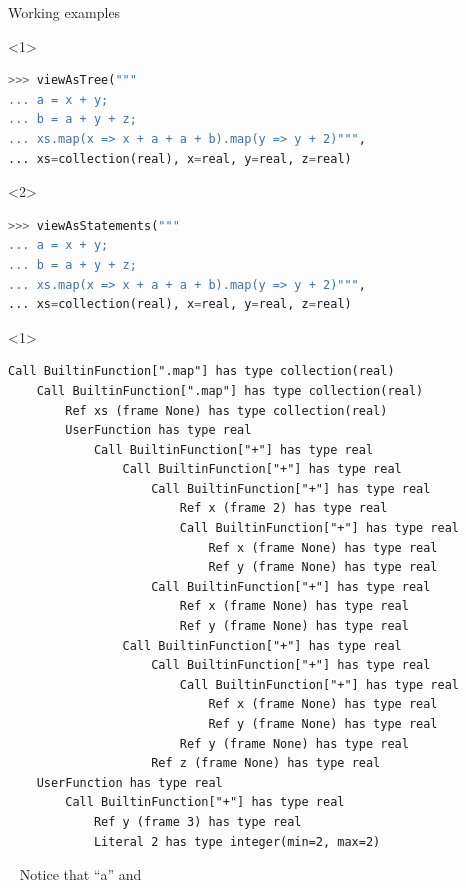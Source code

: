 \documentclass{beamer}
\begin{document}
\begin{frame}[fragile]{Working examples}
\begin{onlyenv}<1>
\begin{lstlisting}[language=python]
>>> viewAsTree("""
... a = x + y;
... b = a + y + z;
... xs.map(x => x + a + a + b).map(y => y + 2)""",
... xs=collection(real), x=real, y=real, z=real)
\end{lstlisting}
\end{onlyenv}
\begin{onlyenv}<2>
\begin{lstlisting}[language=python]
>>> viewAsStatements("""
... a = x + y;
... b = a + y + z;
... xs.map(x => x + a + a + b).map(y => y + 2)""",
... xs=collection(real), x=real, y=real, z=real)
\end{lstlisting}
\end{onlyenv}

\vspace{-0.5 cm}
\begin{minipage}[t][12cm][t]{\textwidth}
\begin{onlyenv}<1>
\begin{lstlisting}[basicstyle=\ttfamily\tiny]
Call BuiltinFunction[".map"] has type collection(real)
    Call BuiltinFunction[".map"] has type collection(real)
        Ref xs (frame None) has type collection(real)
        UserFunction has type real
            Call BuiltinFunction["+"] has type real
                Call BuiltinFunction["+"] has type real
                    Call BuiltinFunction["+"] has type real
                        Ref x (frame 2) has type real
                        Call BuiltinFunction["+"] has type real
                            Ref x (frame None) has type real
                            Ref y (frame None) has type real
                    Call BuiltinFunction["+"] has type real
                        Ref x (frame None) has type real
                        Ref y (frame None) has type real
                Call BuiltinFunction["+"] has type real
                    Call BuiltinFunction["+"] has type real
                        Call BuiltinFunction["+"] has type real
                            Ref x (frame None) has type real
                            Ref y (frame None) has type real
                        Ref y (frame None) has type real
                    Ref z (frame None) has type real
    UserFunction has type real
        Call BuiltinFunction["+"] has type real
            Ref y (frame 3) has type real
            Literal 2 has type integer(min=2, max=2)
\end{lstlisting}
\vspace{-6 cm}
\mbox{ } \hfill Notice that ``a'' and


\end{onlyenv}
\end{minipage}
\end{frame}
\end{document}
